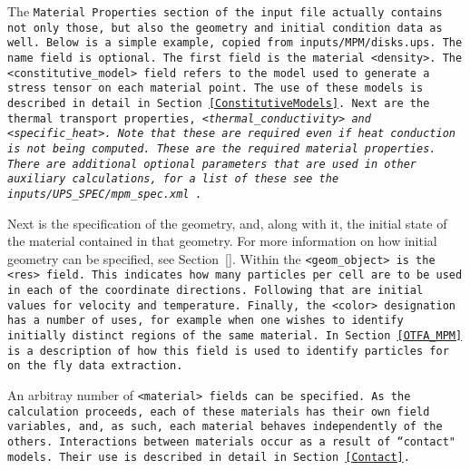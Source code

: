 The \tt Material Properties \normalfont section of the input file
actually contains not only those, but also the geometry and initial
condition data as well.  Below is a simple example, copied from
\tt inputs/MPM/disks.ups. \normalfont  The \tt name \normalfont field
is optional.  The first field is the material \tt <density>. \normalfont
The \tt <constitutive\_model> \normalfont field refers
to the model used to generate a stress tensor on each material point.
The use of these models is described in detail in
Section~\ref{ConstitutiveModels}.  Next are the thermal transport properties,
\it <thermal\_conductivity> \normalfont and 
\it <specific\_heat>. \normalfont  Note that these are required even if
heat conduction is not being computed.  These are the required material
properties.  There are additional optional parameters that are used in
other auxiliary calculations, for a list of these
see the \tt inputs/UPS\_SPEC/mpm\_spec.xml \normalfont.

Next is the specification of the geometry, and, along with it, the initial
state of the material contained in that geometry.  For more information on
how initial geometry can be specified, see Section~\ref{}.  Within the
\tt <geom\_object> \normalfont is the \tt <res> \normalfont field.  This
indicates how many particles per cell are to be used in each of the 
coordinate directions.  Following that are initial values for velocity and
temperature.  Finally, the \tt <color> \normalfont designation has a number
of uses, for example when one wishes to identify initially distinct regions
of the same material.  In Section~\ref{OTFA_MPM} is a description of how
this field is used to identify particles for on the fly data extraction.

An arbitray number of \tt <material> \normalfont fields can be specified.
As the calculation proceeds, each of these materials has their own field
variables, and, as such, each material behaves independently of the others.
Interactions between materials occur as a result of ``contact" models.
Their use is described in detail in Section~\ref{Contact}.

